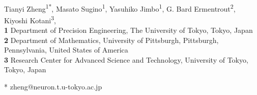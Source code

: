 \documentclass[10pt,letterpaper]{article}
\begin{document}
\vspace*{0.2in}

\begin{flushleft}
{\Large
\textbf{} %
}
\newline
\\
Tianyi Zheng\textsuperscript{1*},
Masato Sugino\textsuperscript{1},
Yasuhiko Jimbo\textsuperscript{1},
G. Bard Ermentrout\textsuperscript{2},
Kiyoshi Kotani\textsuperscript{3},
\\
\bigskip
\textbf{1} Department of Precision Engineering, The University of Tokyo, Tokyo, Japan
\\
\textbf{2} Department of Mathematics, University of Pittsburgh, Pittsburgh, Pennsylvania, United States of America
\\
\textbf{3} Research Center for Advanced Science and Technology, University of Tokyo, Tokyo, Japan
\\
\bigskip


* zheng@neuron.t.u-tokyo.ac.jp

\end{flushleft}
\end{document}
